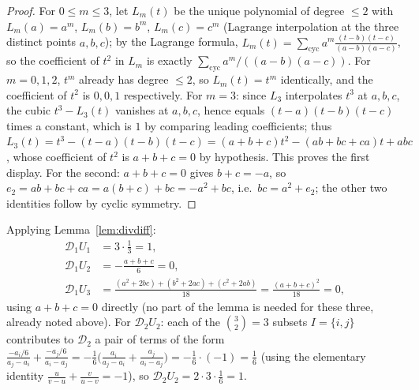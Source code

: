 \documentclass[10pt,a4paper]{amsart}
\begin{document}
\begin{proof}
For $0\le m\le3$, let $L_m(t)$ be the unique polynomial of degree $\le2$ with $L_m(a)=a^m$, $L_m(b)=b^m$, $L_m(c)=c^m$ (Lagrange interpolation at the three distinct points $a,b,c$); by the Lagrange formula, $L_m(t)=\sum_{\mathrm{cyc}}a^m\frac{(t-b)(t-c)}{(a-b)(a-c)}$, so the coefficient of $t^2$ in $L_m$ is exactly $\sum_{\mathrm{cyc}}a^m/((a-b)(a-c))$. For $m=0,1,2$, $t^m$ already has degree $\le2$, so $L_m(t)=t^m$ identically, and the coefficient of $t^2$ is $0,0,1$ respectively. For $m=3$: since $L_3$ interpolates $t^3$ at $a,b,c$, the cubic $t^3-L_3(t)$ vanishes at $a,b,c$, hence equals $(t-a)(t-b)(t-c)$ times a constant, which is $1$ by comparing leading coefficients; thus $L_3(t)=t^3-(t-a)(t-b)(t-c)=(a+b+c)t^2-(ab+bc+ca)t+abc$, whose coefficient of $t^2$ is $a+b+c=0$ by hypothesis. This proves the first display. For the second: $a+b+c=0$ gives $b+c=-a$, so $e_2=ab+bc+ca=a(b+c)+bc=-a^2+bc$, i.e.\ $bc=a^2+e_2$; the other two identities follow by cyclic symmetry.
\end{proof}

Applying Lemma~\ref{lem:divdiff}:
\begin{align*}
\mathcal D_1U_1&=3\cdot\frac13=1,\\
\mathcal D_1U_2&=-\frac{a+b+c}{6}=0,\\
\mathcal D_1U_3&=\frac{(a^2+2bc)+(b^2+2ac)+(c^2+2ab)}{18}=\frac{(a+b+c)^2}{18}=0,
\end{align*}
using $a+b+c=0$ directly (no part of the lemma is needed for these three, already noted above). For $\mathcal D_2U_2$: each of the $\binom32=3$ subsets $I=\{i,j\}$ contributes to $\mathcal D_2$ a pair of terms of the form $\frac{-a_i/6}{a_j-a_i}+\frac{-a_j/6}{a_i-a_j}=-\frac16\Big(\frac{a_i}{a_j-a_i}+\frac{a_j}{a_i-a_j}\Big)=-\frac16\cdot(-1)=\frac16$ (using the elementary identity $\frac{u}{v-u}+\frac{v}{u-v}=-1$), so $\mathcal D_2U_2 = 2\cdot3\cdot\frac16 = 1$.
\end{document}
